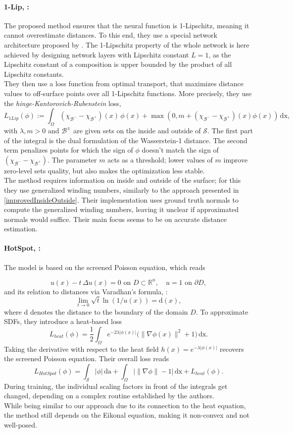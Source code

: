 \documentclass[12pt,openany]{book}
\newcommand{\R}{\mathbb{R}}
\def\S{\mathcal{S}}
\theoremstyle{plainnormal}
\theoremstyle{remark}
\begin{document}
\paragraph{1-Lip, \cite{1lip}:} The proposed method ensures that the neural function is 1-Lipschitz, meaning it cannot overestimate distances. To this end, they use a special network architecture proposed by \cite{araujo2023unifiedalgebraicperspectivelipschitz}. The 1-Lipschitz property of the whole network is here achieved by designing network layers with Lipschitz constant $L=1$, as the Lipschitz constant of a composition is upper bounded by the product of all Lipschitz constants.\\
They then use a loss function from optimal transport, that maximizes distance values to off-surface points over all 1-Lipschitz functions. More precisely, they use the \emph{hinge-Kantorovich-Rubenstein} loss, 
$$
L_{1Lip}(\phi) := \int_\Omega (\chi_{\mathcal B^-}-\chi_{\mathcal B^+})(x)\,\phi(x)  + \max(0,m+ (\chi_{\mathcal B^-}-\chi_{\mathcal B^+})(x)\phi(x))\,\mathrm{dx},
$$
with $\lambda,m >0$ and $\mathcal{B}^\pm$ are given sets on the inside and outside of $\S$. The first part of the integral is the dual formulation of the Wasserstein-1 distance. The second term  penalizes points for which the sign of $\phi$ doesn't match the sign of $ (\chi_{\mathcal B^-}-\chi_{\mathcal B^+})$. The parameter $m$ acts as a threshold; lower values of $m$ improve zero-level sets quality, but also makes the optimization less stable.\\
The method requires information on inside and outside of the surface; for this they use generalized winding numbers, similarly to the approach presented in \cref{improvedInsideOutside}. Their implementation uses ground truth normals to compute the generalized winding numbers, leaving it unclear if approximated normals would suffice. Their main focus seems to be on accurate distance estimation.
\paragraph{HotSpot, \cite{hotspot}:} The model is based on the screened Poisson equation, which reads

$$u(x) - t\,\Delta u(x) = 0 \text{ on } D\subset \R^n, \quad u = 1 \text{ on } \partial D,$$
and its relation to distances via Varadhan's formula, \cite{varadhan}:
$$
\lim_{t\rightarrow0} \sqrt{t}\ln(1/u(x)) = \mathrm{d}(x),$$ 
where $\mathrm{d}$ denotes the distance to the boundary of the domain $D$. To approximate SDFs, they introduce a heat-based loss $$L_{heat}(\phi) = \frac{1}{2}\int_\Omega e^{-2\lambda |\phi(x)|}\big(\|\nabla \phi(x)\|^2 + 1\big) \,\mathrm{dx}.$$ Taking the derivative with respect to the heat field $h(x) = e^{-\lambda|\phi(x)|}$ recovers the screened Poisson equation. Their overall loss reads $$L_{HotSpot}(\phi) = \int_\S |\phi|\,\mathrm{da}  + \int_\Omega \big|\|\nabla \phi\| - 1\big|\,\mathrm{dx} + L_{heat}(\phi).$$
During training, the individual scaling factors in front of the integrals get changed, depending on a complex routine established by the authors.\\ 
While being similar to our approach due to its connection to the heat equation, the method still depends on the Eikonal equation, making it non-convex and not well-posed.
\end{document}
